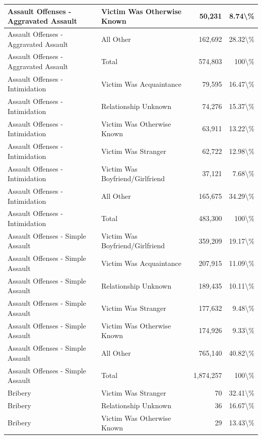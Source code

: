 \documentclass[
]{krantz}
\begin{document}
\begin{longtable}[t]{l|l|r|r}
\hline
Assault Offenses - Aggravated Assault & Victim Was Otherwise Known & 50,231 & 8.74\textbackslash{}\%\\
\hline
Assault Offenses - Aggravated Assault & All Other & 162,692 & 28.32\textbackslash{}\%\\
\hline
Assault Offenses - Aggravated Assault & Total & 574,803 & 100\textbackslash{}\%\\
\hline
Assault Offenses - Intimidation & Victim Was Acquaintance & 79,595 & 16.47\textbackslash{}\%\\
\hline
Assault Offenses - Intimidation & Relationship Unknown & 74,276 & 15.37\textbackslash{}\%\\
\hline
Assault Offenses - Intimidation & Victim Was Otherwise Known & 63,911 & 13.22\textbackslash{}\%\\
\hline
Assault Offenses - Intimidation & Victim Was Stranger & 62,722 & 12.98\textbackslash{}\%\\
\hline
Assault Offenses - Intimidation & Victim Was Boyfriend/Girlfriend & 37,121 & 7.68\textbackslash{}\%\\
\hline
Assault Offenses - Intimidation & All Other & 165,675 & 34.29\textbackslash{}\%\\
\hline
Assault Offenses - Intimidation & Total & 483,300 & 100\textbackslash{}\%\\
\hline
Assault Offenses - Simple Assault & Victim Was Boyfriend/Girlfriend & 359,209 & 19.17\textbackslash{}\%\\
\hline
Assault Offenses - Simple Assault & Victim Was Acquaintance & 207,915 & 11.09\textbackslash{}\%\\
\hline
Assault Offenses - Simple Assault & Relationship Unknown & 189,435 & 10.11\textbackslash{}\%\\
\hline
Assault Offenses - Simple Assault & Victim Was Stranger & 177,632 & 9.48\textbackslash{}\%\\
\hline
Assault Offenses - Simple Assault & Victim Was Otherwise Known & 174,926 & 9.33\textbackslash{}\%\\
\hline
Assault Offenses - Simple Assault & All Other & 765,140 & 40.82\textbackslash{}\%\\
\hline
Assault Offenses - Simple Assault & Total & 1,874,257 & 100\textbackslash{}\%\\
\hline
Bribery & Victim Was Stranger & 70 & 32.41\textbackslash{}\%\\
\hline
Bribery & Relationship Unknown & 36 & 16.67\textbackslash{}\%\\
\hline
Bribery & Victim Was Otherwise Known & 29 & 13.43\textbackslash{}\%\\

\end{longtable}
\end{document}
